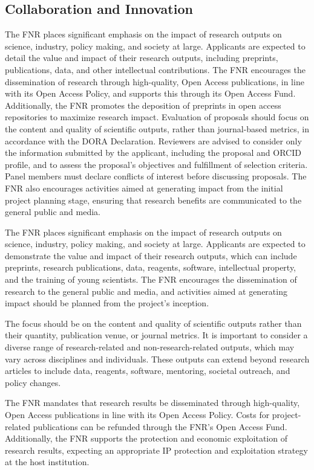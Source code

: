 \documentclass[12pt]{article}
\begin{document}
\subsection{Collaboration and Innovation}

The FNR places significant emphasis on the impact of research outputs on science, industry, policy making, and society at large. Applicants are expected to detail the value and impact of their research outputs, including preprints, publications, data, and other intellectual contributions. The FNR encourages the dissemination of research through high-quality, Open Access publications, in line with its Open Access Policy, and supports this through its Open Access Fund. Additionally, the FNR promotes the deposition of preprints in open access repositories to maximize research impact. Evaluation of proposals should focus on the content and quality of scientific outputs, rather than journal-based metrics, in accordance with the DORA Declaration. Reviewers are advised to consider only the information submitted by the applicant, including the proposal and ORCID profile, and to assess the proposal's objectives and fulfillment of selection criteria. Panel members must declare conflicts of interest before discussing proposals. The FNR also encourages activities aimed at generating impact from the initial project planning stage, ensuring that research benefits are communicated to the general public and media.

The FNR places significant emphasis on the impact of research outputs on science, industry, policy making, and society at large. Applicants are expected to demonstrate the value and impact of their research outputs, which can include preprints, research publications, data, reagents, software, intellectual property, and the training of young scientists. The FNR encourages the dissemination of research to the general public and media, and activities aimed at generating impact should be planned from the project's inception.

The focus should be on the content and quality of scientific outputs rather than their quantity, publication venue, or journal metrics. It is important to consider a diverse range of research-related and non-research-related outputs, which may vary across disciplines and individuals. These outputs can extend beyond research articles to include data, reagents, software, mentoring, societal outreach, and policy changes.

The FNR mandates that research results be disseminated through high-quality, Open Access publications in line with its Open Access Policy. Costs for project-related publications can be refunded through the FNR’s Open Access Fund. Additionally, the FNR supports the protection and economic exploitation of research results, expecting an appropriate IP protection and exploitation strategy at the host institution.
\end{document}
